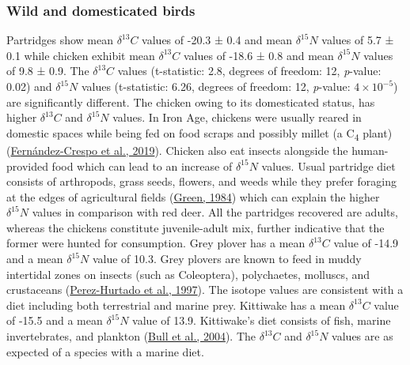 \documentclass[preprint, 3p, authoryear]{elsarticle} %
\begin{document}
\hypertarget{wild-and-domesticated-birds}{%
\subsubsection{Wild and domesticated birds}\label{wild-and-domesticated-birds}}

Partridges show mean \(\delta ^{13}C\) values of -20.3 ± 0.4\text{\textperthousand} and mean \(\delta ^{15}N\) values of 5.7 ± 0.1\text{\textperthousand} while chicken exhibit mean \(\delta ^{13}C\) values of -18.6 ± 0.8\text{\textperthousand} and mean \(\delta ^{15}N\) values of 9.8 ± 0.9\text{\textperthousand}. The \(\delta ^{13}C\) values (t-statistic: 2.8, degrees of freedom: 12, \emph{p}-value: 0.02) and \(\delta ^{15}N\) values (t-statistic: 6.26, degrees of freedom: 12, \emph{p}-value: \ensuremath{4\times 10^{-5}}) are significantly different. The chicken owing to its domesticated status, has higher \(\delta ^{13}C\) and \(\delta ^{15}N\) values. In Iron Age, chickens were usually reared in domestic spaces while being fed on food scraps and possibly millet (a C\textsubscript{4} plant) (\protect\hyperlink{ref-fernandez-crespo_etal19}{Fernández-Crespo et al., 2019}). Chicken also eat insects alongside the human-provided food which can lead to an increase of \(\delta ^{15}N\) values. Usual partridge diet consists of arthropods, grass seeds, flowers, and weeds while they prefer foraging at the edges of agricultural fields (\protect\hyperlink{ref-green84}{Green, 1984}) which can explain the higher \(\delta ^{15}N\) values in comparison with red deer. All the partridges recovered are adults, whereas the chickens constitute juvenile-adult mix, further indicative that the former were hunted for consumption. Grey plover has a mean \(\delta ^{13}C\) value of -14.9\text{\textperthousand} and a mean \(\delta ^{15}N\) value of 10.3\text{\textperthousand}. Grey plovers are known to feed in muddy intertidal zones on insects (such as Coleoptera), polychaetes, molluscs, and crustaceans (\protect\hyperlink{ref-perez-hurtado_etal97}{Perez-Hurtado et al., 1997}). The isotope values are consistent with a diet including both terrestrial and marine prey. Kittiwake has a mean \(\delta ^{13}C\) value of -15.5\text{\textperthousand} and a mean \(\delta ^{15}N\) value of 13.9\text{\textperthousand}. Kittiwake's diet consists of fish, marine invertebrates, and plankton (\protect\hyperlink{ref-bull_etal04}{Bull et al., 2004}). The \(\delta ^{13}C\) and \(\delta ^{15}N\) values are as expected of a species with a marine diet.
\end{document}
